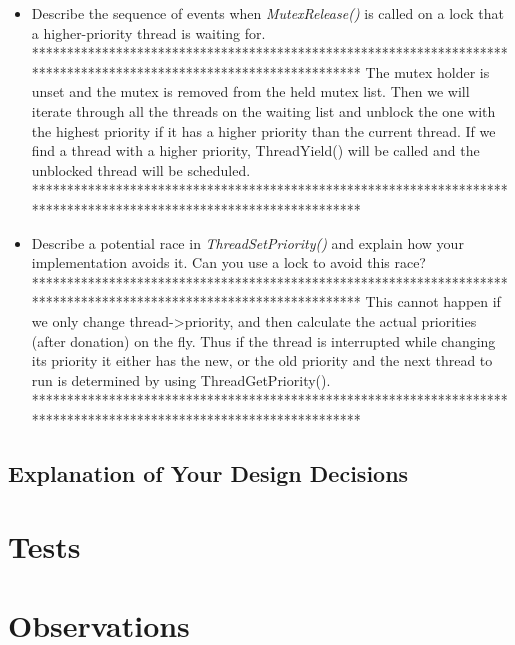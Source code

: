 \begin{enumerate}
\begin{itemize}
            \item Describe the sequence of events when \textit{MutexRelease()} is called on a lock that a higher-priority thread is waiting for.
				*******************************************************************************************************************
				The mutex holder is unset and the mutex is removed from the held mutex list.
				Then we will iterate through all the threads on the waiting list and unblock the one with the highest priority if it has a higher priority than the current thread.
				If we find a thread with a higher priority, ThreadYield() will be called and the unblocked thread will be scheduled.
				*******************************************************************************************************************
            
            \item Describe a potential race in \textit{ThreadSetPriority()} and explain how your implementation avoids it.  Can you use a lock to avoid this race?
				*******************************************************************************************************************
				This cannot happen if we only change thread->priority, and then calculate the actual priorities (after donation) on the fly. Thus if the thread
				is interrupted while changing its priority it either has the new, or the old priority and the next thread to run is determined by using ThreadGetPriority().
				*******************************************************************************************************************
        \end{itemize}
    
\end{enumerate}


\subsection{Explanation of Your Design Decisions}




\section{Tests}



\section{Observations}

